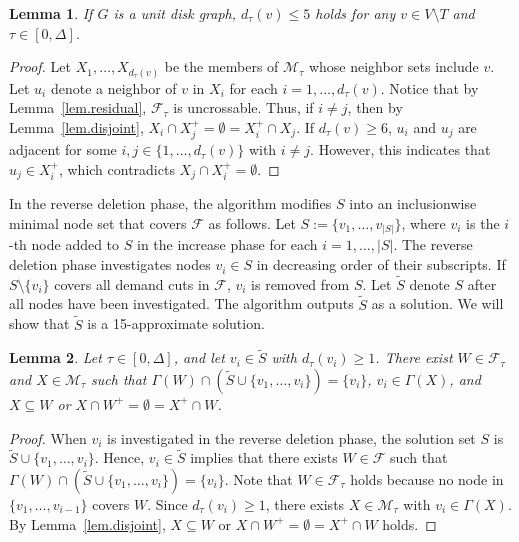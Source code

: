 \documentclass[11pt]{article}
\newcommand{\Ffam}{\mathcal{F}}
\newcommand{\Mfam}{\mathcal{M}}
\newtheorem{lemma}{Lemma}
\begin{document}
  \begin{lemma}
   \label{lem.degree-udg}
   If $G$ is a unit disk graph, 
   $d_{\tau}(v)\leq 5$ holds for any $v \in V \setminus T$ and $\tau \in
   [0,\Delta]$.
  \end{lemma}
 \begin{proof}
  Let
  $X_1,\ldots,X_{d_{\tau}(v)}$ be the
  members of $\Mfam_{\tau}$ whose neighbor sets include
  $v$.
  Let $u_i$ denote
  a neighbor of $v$ in $X_i$ for each $i=1,\ldots,d_{\tau}(v)$.
  Notice that by Lemma~\ref{lem.residual}, $\Ffam_{\tau}$ is uncrossable.
  Thus, if $i\neq j$, then by Lemma~\ref{lem.disjoint}, $X_i \cap X_j^+ = \emptyset = X_i^+ \cap X_j$.
  If $d_{\tau}(v) \geq 6$,
  $u_i$ and $u_j$ are adjacent 
  for some $i,j \in \{1,\ldots,d_{\tau}(v)\}$ with $i\neq j$.
  However,
  this indicates that $u_j \in X^+_i$, which contradicts $X_j \cap
  X^+_i =\emptyset$.
  \end{proof}

  In the reverse deletion phase, the algorithm 
  modifies $S$ into an inclusionwise minimal node set that covers $\Ffam$ as follows.
  Let $S:=\{v_1,\ldots,v_{|S|}\}$, where $v_i$ is the $i$-th node added to $S$ 
  in the increase phase
  for each $i=1,\ldots,|S|$.
  The reverse deletion phase investigates nodes $v_i \in S$ in decreasing order
  of their subscripts. If
  $S \setminus \{v_i\}$ covers all demand cuts in $\Ffam$,
  $v_i$ is removed from $S$.
  Let $\tilde{S}$ denote $S$ after all nodes have been investigated.
  The algorithm outputs $\tilde{S}$ as a solution.
  We will show that $\tilde{S}$ is a 15-approximate solution.
  
  \begin{lemma}\label{lem.witness}
   Let $\tau \in [0,\Delta]$,
   and let $v_i \in \tilde{S}$ with $d_{\tau}(v_i)\geq 1$.
   There exist
   $W \in \Ffam_{\tau}$ and $X \in \Mfam_{\tau}$ such that $\Gamma(W) \cap (\tilde{S} \cup
   \{v_1,\ldots,v_i\})=\{v_i\}$,
    $v_i \in \Gamma(X)$, and
   $X \subseteq W$ or $X \cap W^+= \emptyset = X^+ \cap W$.
  \end{lemma}
   \begin{proof}
    When $v_i$ is investigated in the reverse deletion phase,
    the solution set $S$ is $\tilde{S}\cup \{v_1,\ldots,v_i\}$.
    Hence, 
    $v_{i}\in \tilde{S}$ implies that
    there exists $W \in \Ffam$
    such that 
    $\Gamma(W) \cap (\tilde{S} \cup \{v_1,\ldots,v_i\})=\{v_i\}$.
      Note that $W \in \Ffam_{\tau}$ holds because
    no node in $\{v_1,\ldots,v_{i-1}\}$ covers $W$.
    Since $d_{\tau}(v_i)\geq 1$,
     there exists $X \in \Mfam_{\tau}$ with $v_i \in \Gamma(X)$.
    By Lemma~\ref{lem.disjoint}, $X \subseteq W$ or $X \cap W^+=\emptyset=X^+ \cap W$ holds.
   \end{proof}
\end{document}
